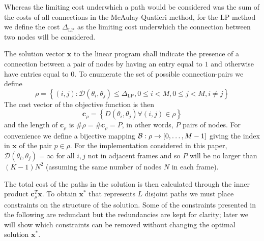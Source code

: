 \documentclass{article}
\newcommand{\cLP}{\boldsymbol{c}_{\rho}}
\newcommand{\BS}[1]{\boldsymbol{#1}}
\begin{document}
\begin{sloppy}
Whereas the limiting cost underwhich a path would be considered was the sum of
the costs of all connections in the McAulay-Quatieri method, for the LP method
we define the cost $\Delta_{\text{LP}}$ as the limiting cost underwhich the
connection between two nodes will be considered.

The solution vector $\BS{x}$ to the linear program shall indicate the presence of a
connection between a pair of nodes by having an entry equal to $1$ and otherwise
have entries equal to $0$. To enumerate the set of possible connection-pairs we
define
\begin{equation}
    \rho = \left\{ (i,j) : \mathcal{D}(\theta_{i},\theta_{j}) \leq
    \Delta_{\text{LP}} , 0 \leq i < M, 0 \leq j < M, i \neq j \right\}
\end{equation}
The cost vector of the objective function is then 
\begin{equation}
    \cLP = \left\{ D(\theta_{i},\theta_{j}) \forall (i,j) \in
    \rho \right\}
\end{equation}
and the length of $\cLP$ is $\# \rho = \# \cLP = P$, in other words, $P$
pairs of nodes. For convenience we define a bijective mapping ${\mathcal{B} :
\rho \rightarrow [0, \mathellipsis, M-1]}$ giving the index in $\BS{x}$ of the
pair $p \in \rho$. For the implementation considered in this paper,
$\mathcal{D}(\theta_{i},\theta_{j}) = \infty$ for all $i,j$ not in adjacent
frames and so $P$ will be no larger than $(K-1)N^{2}$ (assuming the same
number of nodes $N$ in each frame).

The total cost of the paths in the solution is then calculated through the
inner product $\cLP^{T}\BS{x}$. To obtain $\BS{x}^{\ast}$ that represents $L$
disjoint paths we must place constraints on the structure of the solution. Some
of the constraints presented in the following are redundant but the redundancies
are kept for clarity; later we will show which constraints can be removed
without changing the optimal solution $\BS{x}^{\ast}$.


\end{sloppy}
\end{document}
